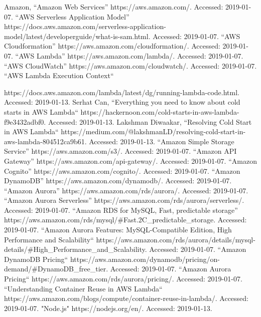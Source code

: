 \documentclass[conference]{IEEEtran}
\begin{document}
\begin{thebibliography}{00}
 Amazon, “Amazon Web Services” https://aws.amazon.com/. Accessed: 2019-01-07.
 “AWS Serverless Application Model” https://docs.aws.amazon.com/serverless-application-model/latest/developerguide/what-is-sam.html. Accessed: 2019-01-07.
 “AWS Cloudformation” https://aws.amazon.com/cloudformation/. Accessed: 2019-01-07.
 “AWS Lambda” https://aws.amazon.com/lambda/. Accessed: 2019-01-07.
 “AWS CloudWatch” https://aws.amazon.com/cloudwatch/. Accessed: 2019-01-07.
 “AWS Lambda Execution Context“

https://docs.aws.amazon.com/lambda/latest/dg/running-lambda-code.html. Accessed: 2019-01-13.
 Serhat Can, “Everything you need to know about cold starts in AWS Lambda“ https://hackernoon.com/cold-starts-in-aws-lambda-f9e3432adbf0. Accessed: 2019-01-13.
 Lakshman Diwaakar, “Resolving Cold Start in AWS Lambda“ https://medium.com/@lakshmanLD/resolving-cold-start-in-aws-lambda-804512ca9b61. Accessed: 2019-01-13.
 “Amazon Simple Storage Service” https://aws.amazon.com/s3/. Accessed: 2019-01-07.
 “Amazon API Gateway” https://aws.amazon.com/api-gateway/. Accessed: 2019-01-07.
 “Amazon Cognito” https://aws.amazon.com/cognito/. Accessed: 2019-01-07.
 “Amazon DynamoDB” https://aws.amazon.com/dynamodb/. Accessed: 2019-01-07.
 “Amazon Aurora” https://aws.amazon.com/rds/aurora/. Accessed: 2019-01-07.
 “Amazon Aurora Serverless” https://aws.amazon.com/rds/aurora/serverless/. Accessed: 2019-01-07.
 “Amazon RDS for MySQL, Fast, predictable storage” https://aws.amazon.com/rds/mysql/\#Fast.2C\_predictable\_storage. Accessed: 2019-01-07.
 “Amazon Aurora Features: MySQL-Compatible Edition, High Performance and Scalability“ https://aws.amazon.com/rds/aurora/details/mysql-details/\#High\_Performance\_and\_Scalability. Accessed: 2019-01-07.
 “Amazon DynamoDB Pricing“ https://aws.amazon.com/dynamodb/pricing/on-demand/\#DynamoDB\_free\_tier. Accessed: 2019-01-07.
 “Amazon Aurora Pricing“ https://aws.amazon.com/rds/aurora/pricing/. Accessed: 2019-01-07.
 “Understanding Container Reuse in AWS Lambda“ https://aws.amazon.com/blogs/compute/container-reuse-in-lambda/. Accessed: 2019-01-07.
 "Node.js" https://nodejs.org/en/. Accessed: 2019-01-13.

\end{thebibliography}
\end{document}
